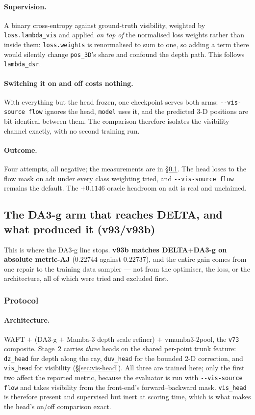 \documentclass[11pt,a4paper]{article}
\begin{document}
\paragraph{Supervision.} A binary cross-entropy against ground-truth visibility, weighted by
\texttt{loss.lambda\_vis} and applied \emph{on top of} the normalised loss weights rather than
inside them: \texttt{loss.weights} is renormalised to sum to one, so adding a term there would
silently change \texttt{pos\_3D}'s share and confound the depth path. This follows
\texttt{lambda\_dsr}.

\paragraph{Switching it on and off costs nothing.} With everything but the head frozen, one
checkpoint serves both arms: \texttt{-{}-vis-source flow} ignores the head, \texttt{model} uses
it, and the predicted 3-D positions are bit-identical between them. The comparison therefore
isolates the visibility channel exactly, with no second training run.

\paragraph{Outcome.} Four attempts, all negative; the measurements are in \S\ref{sec:v93}. The
head loses to the flow mask on adt under every class weighting tried, and
\texttt{-{}-vis-source flow} remains the default. The $+0.1146$ oracle headroom on adt is real and
unclaimed.



\subsection{The DA3-g arm that reaches DELTA, and what produced it (v93/v93b)}
\label{sec:v93}
This is where the DA3-g line stops. \textbf{v93b matches DELTA$+$DA3-g on absolute metric-AJ}
($0.22744$ against $0.22737$), and the entire gain comes from one repair to the training data
sampler --- not from the optimiser, the loss, or the architecture, all of which were tried and
excluded first.

\subsubsection{Protocol}
\paragraph{Architecture.} WAFT $+$ (DA3-g $+$ Mamba-3 depth scale refiner) $+$ vmamba3-2pool,
the \texttt{v73} composite. Stage~2 carries \emph{three} heads on the shared per-point trunk
feature: \texttt{dz\_head} for depth along the ray, \texttt{duv\_head} for the bounded 2-D
correction, and \texttt{vis\_head} for visibility (\S\ref{sec:vis-head}). All three are trained
here; only the first two affect the reported metric, because the evaluator is run with
\texttt{-{}-vis-source flow} and takes visibility from the front-end's forward--backward mask.
\texttt{vis\_head} is therefore present and supervised but inert at scoring time, which is what
makes the head's on/off comparison exact.
\end{document}
